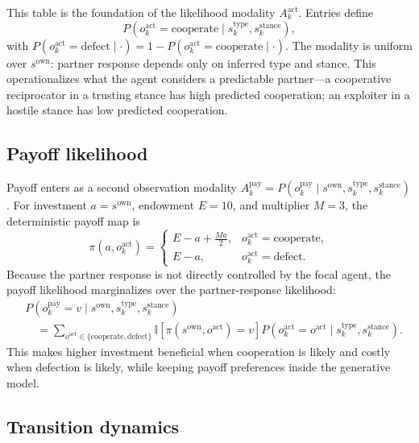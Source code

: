 This table is the foundation of the likelihood modality $A^{\text{act}}_k$. Entries define
\begin{equation}
P\!\left(o_k^{\mathrm{act}}=\mathrm{cooperate}\mid s_k^{\mathrm{type}}, s_k^{\mathrm{stance}}\right),
\label{eq:a_act_coop}
\end{equation}
with $P(o_k^{\mathrm{act}}=\mathrm{defect}\mid\cdot)=1-P(o_k^{\mathrm{act}}=\mathrm{cooperate}\mid\cdot)$. The modality is uniform over $s^{\mathrm{own}}$: partner response depends only on inferred type and stance. This operationalizes what the agent considers a predictable partner---a cooperative reciprocator in a trusting stance has high predicted cooperation; an exploiter in a hostile stance has low predicted cooperation.

\subsection{Payoff likelihood}

Payoff enters as a second observation modality \(A^{\mathrm{pay}}_k = P(o^{\mathrm{pay}}_k \mid s^{\mathrm{own}},s^{\mathrm{type}}_k,s^{\mathrm{stance}}_k)\). For investment \(a=s^{\mathrm{own}}\), endowment \(E=10\), and multiplier \(M=3\), the deterministic payoff map is
\begin{equation}
\pi(a,o_k^{\mathrm{act}})=
\begin{cases}
E-a+\frac{Ma}{2}, & o_k^{\mathrm{act}}=\mathrm{cooperate},\\
E-a, & o_k^{\mathrm{act}}=\mathrm{defect}.
\end{cases}
\label{eq:graded_payoff_map}
\end{equation}
Because the partner response is not directly controlled by the focal agent, the payoff likelihood marginalizes over the partner-response likelihood:
\begin{align}
&P(o^{\mathrm{pay}}_k=v \mid s^{\mathrm{own}},s^{\mathrm{type}}_k,s^{\mathrm{stance}}_k) \nonumber\\
&\quad =
\sum_{o^{\mathrm{act}}\in\{\mathrm{cooperate},\mathrm{defect}\}}
\mathbb{I}\!\left[\pi(s^{\mathrm{own}},o^{\mathrm{act}})=v\right]
P(o^{\mathrm{act}}_k=o^{\mathrm{act}} \mid s^{\mathrm{type}}_k,s^{\mathrm{stance}}_k).
\label{eq:a_pay_marginal}
\end{align}
This makes higher investment beneficial when cooperation is likely and costly when defection is likely, while keeping payoff preferences inside the generative model.

\subsection{Transition dynamics}

